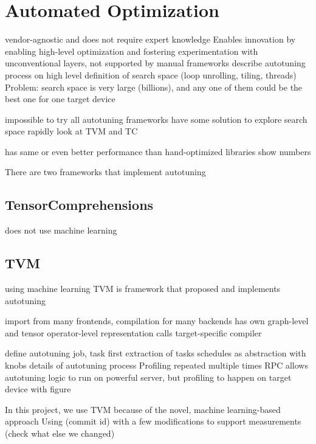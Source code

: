\section{Automated Optimization}
vendor-agnostic and does not require expert knowledge
Enables innovation by enabling high-level optimization and fostering experimentation with unconventional layers, not supported by manual frameworks
describe autotuning process on high level
definition of search space (loop unrolling, tiling, threads)
Problem: search space is very large (billions), and any one of them could be the best one for one target device

impossible to try all
autotuning frameworks have some solution to explore search space rapidly
look at TVM and TC

has same or even better performance than hand-optimized libraries
show numbers

There are two frameworks that implement autotuning

\subsection{TensorComprehensions}
does not use machine learning

\subsection{TVM}
using machine learning
TVM is framework that proposed and implements autotuning

import from many frontends, compilation for many backends
has own graph-level and tensor operator-level representation
calls target-specific compiler

define autotuning job, task
first extraction of tasks
schedules as abstraction with knobs
details of autotuning process
Profiling repeated multiple times
RPC allows autotuning logic to run on powerful server, but profiling to happen on target device
with figure

In this project, we use TVM because of the novel, machine learning-based approach
Using (commit id) with a few modifications to support measurements (check what else we changed)
